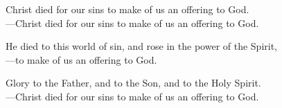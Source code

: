 \responsory

\noindent Christ died for our sins to make of us an offering to God.\\
{\color{red}---\thinspace}Christ died for our sins to make of us an offering to God.

\medskip\noindent He died to this world of sin, and rose in the power of the Spirit,\\
{\color{red}---\thinspace}to make of us an offering to God.

\medskip\noindent Glory to the Father, and to the Son, and to the Holy Spirit.\\
{\color{red}---\thinspace}Christ died for our sins to make of us an offering to God.